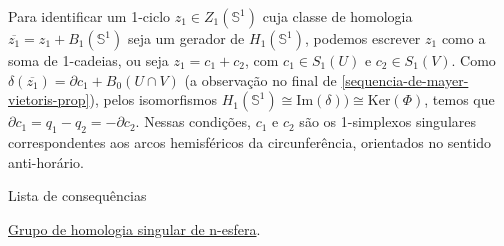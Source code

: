 Para identificar um 1-ciclo $z_1\in Z_1(\mathbb{S}^1)$ cuja classe de homologia $\overline{z_1}=z_1+B_1 (\mathbb{S}^1)$ seja um gerador de $H_1(\mathbb{S}^1)$, podemos escrever $z_1$ como a soma de 1-cadeias, ou seja $z_1=c_1+c_2$, com $c_1\in S_1(U)$ e $c_2\in S_1(V)$. Como $\delta(\overline{z_1})=\partial c_1+B_0(U\cap V)$ (a observação no final de \ref{sequencia-de-mayer-vietoris-prop}), pelos isomorfismos $H_1(\mathbb{S}^1)\cong\text{Im}(\delta))\cong \text{Ker}(\Phi)$, temos que $\partial c_1=q_1-q_2=-\partial c_2$. Nessas condições, $c_1$ e $c_2$ são os 1-simplexos singulares correspondentes aos arcos hemisféricos da circunferência, orientados no sentido anti-horário.

\begin{titlemize}{Lista de consequências}
    \item \hyperref[grupo-de-homologia-singular-de-n-esfera-prop]{Grupo de homologia singular de n-esfera}.\\
\end{titlemize}
